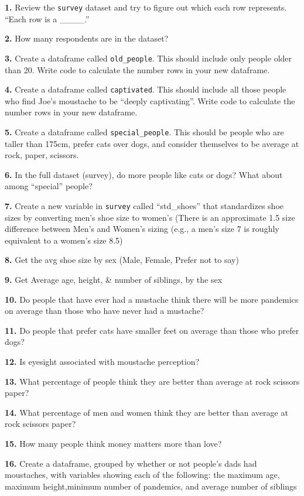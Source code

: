 \documentclass[
]{book}
\begin{document}
\textbf{1.} Review the \texttt{survey} dataset and try to figure out which each row represents. ``Each row is a \_\_\_\_.''

\textbf{2.} How many respondents are in the dataset?

\textbf{3.} Create a dataframe called \texttt{old\_people}. This should include only people older than 20. Write code to calculate the number rows in your new dataframe.

\textbf{4.} Create a dataframe called \texttt{captivated}. This should include all those people who find Joe's moustache to be ``deeply captivating''. Write code to calculate the number rows in your new dataframe.

\textbf{5.} Create a dataframe called \texttt{special\_people}. This should be people who are taller than 175cm, prefer cats over dogs, and consider themselves to be average at rock, paper, scissors.

\textbf{6.} In the full dataset (survey), do more people like cats or dogs? What about among ``special'' people?

\textbf{7.} Create a new variable in \texttt{survey} called ``std\_shoes'' that standardizes shoe sizes by converting men's shoe size to women's (There is an approximate 1.5 size difference between Men's and Women's sizing (e.g., a men's size 7 is roughly equivalent to a women's size 8.5)

\textbf{8.} Get the avg shoe size by sex (Male, Female, Prefer not to say)

\textbf{9.} Get Average age, height, \& number of siblings, by the sex

\textbf{10.} Do people that have ever had a mustache think there will be more pandemics on average than those who have never had a mustache?

\textbf{11.} Do people that prefer cats have smaller feet on average than those who prefer dogs?

\textbf{12.} Is eyesight associated with moustache perception?

\textbf{13.} What percentage of people think they are better than average at rock scissors paper?

\textbf{14.} What percentage of men and women think they are better than average at rock scissors paper?

\textbf{15.} How many people think money matters more than love?

\textbf{16.} Create a dataframe, grouped by whether or not people's dads had moustaches, with variables showing each of the following: the maximum age, maximum height,minimum number of pandemics, and average number of siblings
\end{document}
